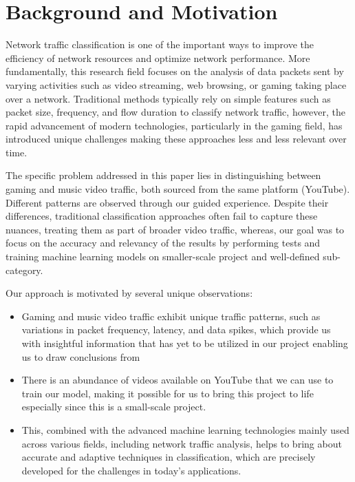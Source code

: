 \section{Background and Motivation}
\label{sec:background}





Network traffic classification is one of the important ways to improve the efficiency of network resources and optimize network performance. More fundamentally, this research field focuses on the analysis of data packets sent by varying activities such as video streaming, web browsing, or gaming taking place over a network. Traditional methods typically rely on simple features such as packet size, frequency, and flow duration to classify network traffic, however, the rapid advancement of modern technologies, particularly in the gaming field, has introduced unique challenges making these approaches less and less relevant over time.

\vspace{2mm}

The specific problem addressed in this paper lies in distinguishing between gaming and music video traffic, both sourced from the same platform (YouTube). Different patterns are observed through our guided experience. Despite their differences, traditional classification approaches often fail to capture these nuances, treating them as part of broader video traffic, whereas, our goal was to focus on the accuracy and relevancy of the results by performing tests and training machine learning models on smaller-scale project and well-defined sub-category.

Our approach is motivated by several unique observations:
\begin{itemize}
    \item Gaming and music video traffic exhibit unique traffic patterns, such as variations in packet frequency, latency, and data spikes, which provide us with insightful information that has yet to be utilized in our project enabling us to draw conclusions from
    \item There is an abundance of videos available on YouTube that we can use to train our model, making it possible for us to bring this project to life especially since this is a small-scale project.
    \item This, combined with the advanced machine learning technologies mainly used across various fields, including network traffic analysis, helps to bring about accurate and adaptive techniques in classification, which are precisely developed for the challenges in today's applications.
\end{itemize}

